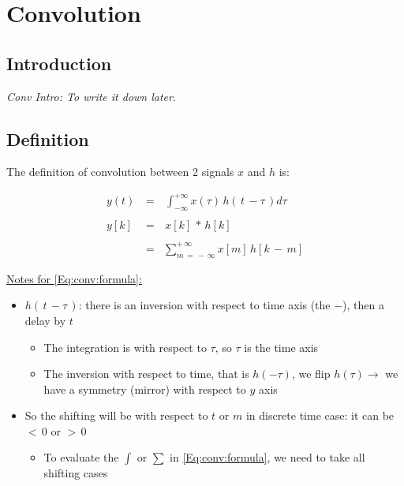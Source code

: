

\chapter{Convolution}

\section{Introduction}

 \textit{Conv Intro: To write it down later}.

\section{Definition}

The definition of convolution between 2 signals $x$ and $h$ is:

\begin{equation}
\begin{array}{rcl}

y(t) \, &=& \, \displaystyle \int_{-\infty}^{+\infty} x(\tau) \, h\left(\,t \, - \tau\, \right) d \tau \\ \\

y[k] \, &=& \, x[k] \, * \, h[k] \\ \\
 &=& \displaystyle\sum_{m \, = \, - \, \infty}^{+ \, \infty} x[m] \, h[k \, - \, m] 		
\end{array}
\label{Eq:conv:formula}
\end{equation}

\underline{Notes for \autoref{Eq:conv:formula}:}

\begin{itemize}

\item $h\left(\,t \, - \tau\, \right)$: there is an inversion with respect to time axis (the $-$), then a delay by $t$

    \begin{itemize}
    \item  The integration is with respect to $\tau$, so $\tau$ is the time axis

    \item  The inversion with respect to time, that is  $h(-\tau)$, we flip $h(\tau) \rightarrow$ we have a symmetry (mirror) with respect to $y$ axis
    \end{itemize}

\item  So the shifting will be with respect to $t$ or $m$ in discrete time case: it can be $< \, 0$ or $> \, 0$

    \begin{itemize}
    \item To evaluate the $\displaystyle\int$ or $\displaystyle\sum$ in \autoref{Eq:conv:formula}, we need to take all shifting cases
    \end{itemize}

\end{itemize}

